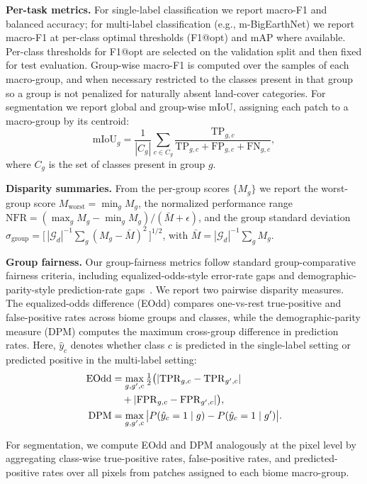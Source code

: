 \documentclass[10pt,twocolumn,letterpaper]{article}
\begin{document}
\smallskip
\textbf{Per-task metrics.} For single-label classification we report macro-F1 and balanced accuracy; for multi-label classification (e.g., m-BigEarthNet) we report macro-F1 at per-class optimal thresholds (F1@opt) and mAP where available. Per-class thresholds for F1@opt are selected on the validation split and then fixed for test evaluation. Group-wise macro-F1 is computed over the samples of each macro-group, and when necessary restricted to the classes present in that group so a group is not penalized for naturally absent land-cover categories. For segmentation we report global and group-wise mIoU, assigning each patch to a macro-group by its centroid:
\begin{equation}
\mathrm{mIoU}_g = \frac{1}{|C_g|}\sum_{c\in C_g}\frac{\mathrm{TP}_{g,c}}{\mathrm{TP}_{g,c}+\mathrm{FP}_{g,c}+\mathrm{FN}_{g,c}},
\end{equation}
where $C_g$ is the set of classes present in group $g$.

\smallskip
\textbf{Disparity summaries.} From the per-group scores $\{M_g\}$ we report the worst-group score $M_{\mathrm{worst}}=\min_g M_g$, the normalized performance range $\mathrm{NFR}=(\max_g M_g-\min_g M_g)/(\bar M+\epsilon)$, and the group standard deviation $\sigma_{\mathrm{group}}=\big[\,|\mathcal{G}_d|^{-1}\sum_g (M_g-\bar M)^2\,\big]^{1/2}$, with $\bar M=|\mathcal{G}_d|^{-1}\sum_g M_g$.

\smallskip
\textbf{Group fairness.}
Our group-fairness metrics follow standard group-comparative fairness criteria, including equalized-odds-style error-rate gaps and demographic-parity-style prediction-rate gaps~\cite{hardt2016equality,woodworth2017learning}. We report two pairwise disparity measures. The equalized-odds difference (EOdd) compares one-vs-rest true-positive and false-positive rates across biome groups and classes, while the demographic-parity measure (DPM) computes the maximum cross-group difference in prediction rates. Here, $\hat{y}_c$ denotes whether class $c$ is predicted in the single-label setting or predicted positive in the multi-label setting:
\begin{align}
\mathrm{EOdd} &= \max_{g,g',c}\tfrac{1}{2}\big(|\mathrm{TPR}_{g,c}-\mathrm{TPR}_{g',c}|\notag\\
&\quad+|\mathrm{FPR}_{g,c}-\mathrm{FPR}_{g',c}|\big),\\
\mathrm{DPM} &= \max_{g,g',c}\big|P(\hat{y}_c=1\mid g)-P(\hat{y}_c=1\mid g')\big|.
\end{align}

For segmentation, we compute EOdd and DPM analogously at the pixel level by aggregating class-wise true-positive rates, false-positive rates, and predicted-positive rates over all pixels from patches assigned to each biome macro-group.
\end{document}

